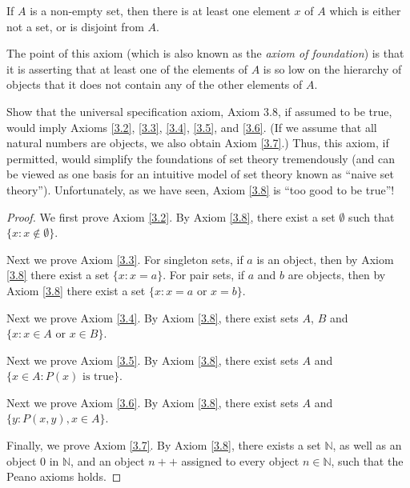 \begin{axiom}[Regularity]\label{3.9}
If \(A\) is a non-empty set, then there is at least one element \(x\) of \(A\) which is either not a set, or is disjoint from \(A\).
\end{axiom}

\begin{note}
The point of this axiom (which is also known as the \emph{axiom of foundation}) is that it is asserting that at least one of the elements of \(A\) is so low on the hierarchy of objects that it does not contain any of the other elements of \(A\).
\end{note}

\exercisesection

\begin{exercise}\label{ex 3.2.1}
Show that the universal specification axiom, Axiom 3.8, if assumed to be true, would imply Axioms \ref{3.2}, \ref{3.3}, \ref{3.4}, \ref{3.5}, and \ref{3.6}.
(If we assume that all natural numbers are objects, we also obtain Axiom \ref{3.7}.)
Thus, this axiom, if permitted, would simplify the foundations of set theory tremendously (and can be viewed as one basis for an intuitive model of set theory known as ``naive set theory'').
Unfortunately, as we have seen, Axiom \ref{3.8} is ``too good to be true''!
\end{exercise}

\begin{proof}
We first prove Axiom \ref{3.2}.
By Axiom \ref{3.8}, there exist a set \(\emptyset\) such that \(\{x: x \notin \emptyset\}\).

Next we prove Axiom \ref{3.3}.
For singleton sets, if \(a\) is an object, then by Axiom \ref{3.8} there exist a set \(\{x: x = a\}\).
For pair sets, if \(a\) and \(b\) are objects, then by Axiom \ref{3.8} there exist a set \(\{x: x = a \text{ or } x = b\}\).

Next we prove Axiom \ref{3.4}.
By Axiom \ref{3.8}, there exist sets \(A\), \(B\) and \(\{x : x \in A \text{ or } x \in B\}\).

Next we prove Axiom \ref{3.5}.
By Axiom \ref{3.8}, there exist sets \(A\) and \(\{x \in A : P(x) \text{ is true}\}\).

Next we prove Axiom \ref{3.6}.
By Axiom \ref{3.8}, there exist sets \(A\) and \(\{y : P(x, y), x \in A\}\).

Finally, we prove Axiom \ref{3.7}.
By Axiom \ref{3.8}, there exists a set \(\mathds{N}\), as well as an object \(0\) in \(\mathds{N}\), and an object \(n++\) assigned to every object \(n \in \mathds{N}\), such that the Peano axioms holds.
\end{proof}

